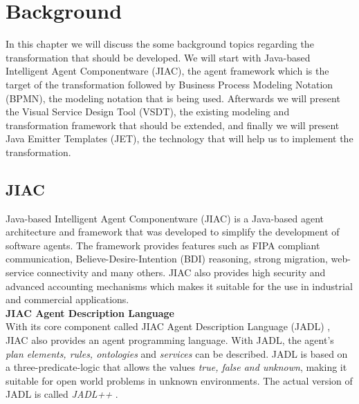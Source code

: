 \chapter{Background}
\label{chap:background}
In this chapter we will discuss the some background topics regarding the transformation that should be developed. We will start with Java-based Intelligent Agent Componentware (JIAC), the agent framework which is the target of the transformation followed by Business Process Modeling Notation (BPMN), the modeling notation that is being used. Afterwards we will present the Visual Service Design Tool (VSDT), the existing modeling and transformation framework that should be extended, and finally we will present Java Emitter Templates (JET), the technology that will help us to implement the transformation.

\section{JIAC}
Java-based Intelligent Agent Componentware (JIAC) is a Java-based agent architecture and framework that was developed to simplify the development of software agents\cite{JIACWEB}. The framework provides features such as FIPA compliant communication, Believe-Desire-Intention (BDI) reasoning, strong migration, web-service
connectivity and many others. JIAC also provides high security and advanced accounting mechanisms which makes it suitable for the use in industrial and commercial applications.\\

\textbf{JIAC Agent Description Language}\\
With its core component called JIAC Agent Description Language (JADL) \cite{jadl_basic}, JIAC also provides an agent programming language. With JADL, the agent's \textit{plan elements, rules, ontologies} and \textit{services} can be described. JADL is based on a three-predicate-logic that allows the values \textit{true, false and unknown}, making it suitable for open world problems in unknown environments. The actual version of JADL is called \textit{JADL++} \cite{BHTKAH09}.\\

